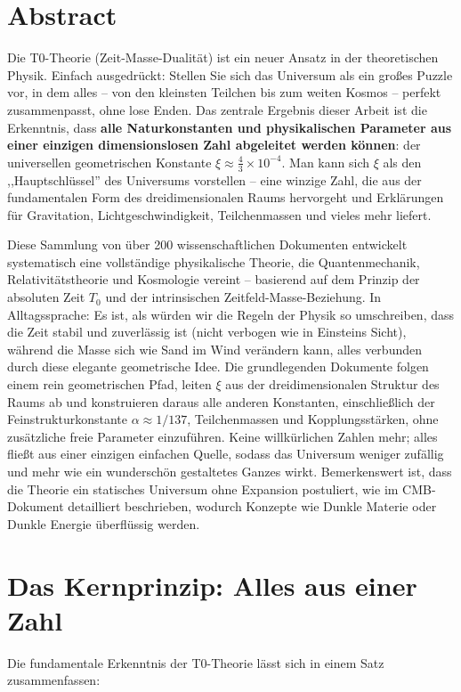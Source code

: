 \section*{Abstract}
		Die T0-Theorie (Zeit-Masse-Dualität) ist ein neuer Ansatz in der theoretischen Physik. Einfach ausgedrückt: Stellen Sie sich das Universum als ein großes Puzzle vor, in dem alles – von den kleinsten Teilchen bis zum weiten Kosmos – perfekt zusammenpasst, ohne lose Enden. Das zentrale Ergebnis dieser Arbeit ist die Erkenntnis, dass \textbf{alle Naturkonstanten und physikalischen Parameter aus einer einzigen dimensionslosen Zahl abgeleitet werden können}: der universellen geometrischen Konstante $\xi \approx \frac{4}{3} \times 10^{-4}$. Man kann sich $\xi$ als den ,,Hauptschlüssel'' des Universums vorstellen – eine winzige Zahl, die aus der fundamentalen Form des dreidimensionalen Raums hervorgeht und Erklärungen für Gravitation, Lichtgeschwindigkeit, Teilchenmassen und vieles mehr liefert.
		
		Diese Sammlung von über 200 wissenschaftlichen Dokumenten entwickelt systematisch eine vollständige physikalische Theorie, die Quantenmechanik, Relativitätstheorie und Kosmologie vereint – basierend auf dem Prinzip der absoluten Zeit $T_0$ und der intrinsischen Zeitfeld-Masse-Beziehung. In Alltagssprache: Es ist, als würden wir die Regeln der Physik so umschreiben, dass die Zeit stabil und zuverlässig ist (nicht verbogen wie in Einsteins Sicht), während die Masse sich wie Sand im Wind verändern kann, alles verbunden durch diese elegante geometrische Idee. Die grundlegenden Dokumente folgen einem rein geometrischen Pfad, leiten $\xi$ aus der dreidimensionalen Struktur des Raums ab und konstruieren daraus alle anderen Konstanten, einschließlich der Feinstrukturkonstante $\alpha \approx 1/137$, Teilchenmassen und Kopplungsstärken, ohne zusätzliche freie Parameter einzuführen. Keine willkürlichen Zahlen mehr; alles fließt aus einer einzigen einfachen Quelle, sodass das Universum weniger zufällig und mehr wie ein wunderschön gestaltetes Ganzes wirkt. Bemerkenswert ist, dass die Theorie ein statisches Universum ohne Expansion postuliert, wie im CMB-Dokument detailliert beschrieben, wodurch Konzepte wie Dunkle Materie oder Dunkle Energie überflüssig werden.

	
	\section{Das Kernprinzip: Alles aus einer Zahl}
	
	Die fundamentale Erkenntnis der T0-Theorie lässt sich in einem Satz zusammenfassen:
	
